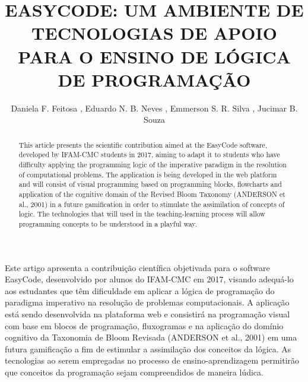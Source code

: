 \documentclass[12pt]{article}
\title{EASYCODE: UM AMBIENTE DE TECNOLOGIAS DE APOIO PARA O ENSINO DE LÓGICA DE PROGRAMAÇÃO}
\author{Daniela F. Feitosa \inst{1}, Eduardo N. B. Neves \inst{1}, Emmerson S. R. Silva \inst{1}, Jucimar B. Souza \inst{1}}
\begin{document}
 

\maketitle

\begin{abstract}
This article presents the scientific contribution aimed at the EasyCode software, developed by IFAM-CMC students in 2017, aiming to adapt it to students who have difficulty applying the programming logic of the imperative paradigm in the resolution of computational problems. The application is being developed in the web platform and will consist of visual programming based on programming blocks, flowcharts and application of the cognitive domain of the Revised Bloom Taxonomy (ANDERSON et al., 2001) in a future gamification in order to stimulate the assimilation of concepts of logic. The technologies that will used in the teaching-learning process will allow programming concepts to be understood in a playful way.

\end{abstract}
     
\begin{resumo}
Este artigo apresenta a contribuição científica objetivada para o software EasyCode, desenvolvido por alunos do IFAM-CMC em 2017, visando adequá-lo aos estudantes que têm dificuldade em aplicar a lógica de programação do paradigma imperativo na resolução de problemas computacionais. A aplicação está sendo desenvolvida na plataforma web e consistirá na programação visual com base em blocos de programação, fluxogramas e na aplicação do domínio cognitivo da Taxonomia de Bloom Revisada (ANDERSON et al., 2001) em uma futura gamificação a fim de estimular a assimilação dos conceitos da lógica. As tecnologias ao serem empregadas no processo de ensino-aprendizagem permitirão que conceitos da programação sejam compreendidos de maneira lúdica.
\end{resumo}
\end{document}
